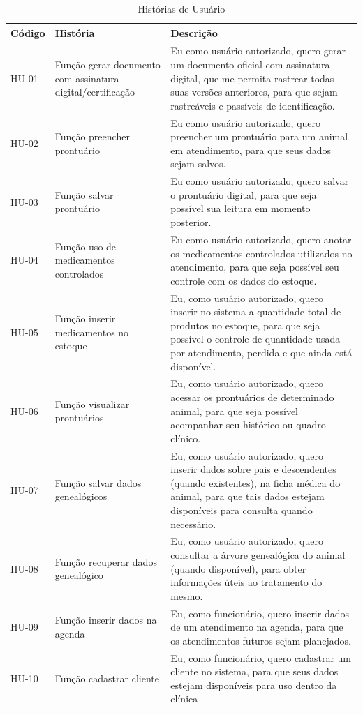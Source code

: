 \documentclass[
    12pt,               %
    openright,          %
    oneside,
    a4paper,            %
    BIBLATEX,           %
    TODO,               %
    english,            %
    brazil              %
    ]{ifsp-spo-inf-ctds}
\begin{document}
    \begin{center}
        \begin{table}[H]
        \centering
        \begin{tabulary}{1.0\textwidth}{|p{5em}|p{8em}|p{18em}|}
        \hline
        Código & História & Descrição\\
        \hline
        HU-01 & Função gerar documento com assinatura digital/certificação & Eu como usuário autorizado, quero gerar um documento oficial com assinatura digital, que me permita rastrear todas suas versões anteriores, para que sejam rastreáveis e passíveis de identificação.\\
        \hline
        HU-02 & Função preencher prontuário & Eu como usuário autorizado, quero preencher um prontuário para um animal em atendimento, para que seus dados sejam salvos.\\
        \hline
        HU-03 & Função salvar prontuário & Eu como usuário autorizado, quero salvar o prontuário digital, para que seja possível sua leitura em momento posterior.\\
        \hline
        HU-04 & Função uso de medicamentos controlados & Eu como usuário autorizado, quero anotar os medicamentos controlados utilizados no atendimento, para que seja possível seu controle com os dados do estoque.\\
        \hline
        HU-05 & Função inserir medicamentos no estoque & Eu, como usuário autorizado, quero inserir no sistema a quantidade total de produtos no estoque, para que seja possível o controle de quantidade usada por atendimento, perdida e que ainda está disponível.\\
        \hline
        HU-06 & Função visualizar prontuários & Eu, como usuário autorizado, quero acessar os prontuários de determinado animal, para que seja possível acompanhar seu histórico ou quadro clínico.\\
        \hline
        HU-07 & Função salvar dados genealógicos &  Eu, como usuário autorizado, quero inserir dados sobre pais e descendentes (quando existentes), na ficha médica do animal, para que tais dados estejam disponíveis para consulta quando necessário.\\
        \hline
        HU-08 &  Função recuperar dados genealógico &  Eu, como usuário autorizado, quero consultar a árvore genealógica do animal (quando disponível), para obter informações úteis ao tratamento do mesmo.\\
        \hline
        HU-09 & Função inserir dados na agenda & Eu, como funcionário, quero inserir dados de um atendimento na agenda, para que os atendimentos futuros sejam planejados.\\
        \hline
        HU-10 & Função cadastrar cliente & Eu, como funcionário, quero cadastrar um cliente no sistema, para que seus dados estejam disponíveis para uso dentro da clínica\\
        \hline
        \end{tabulary}
        \caption{Histórias de Usuário}
        \label{tab:hist_usuario}
        \end{table}
    \end{center}
\end{document}
